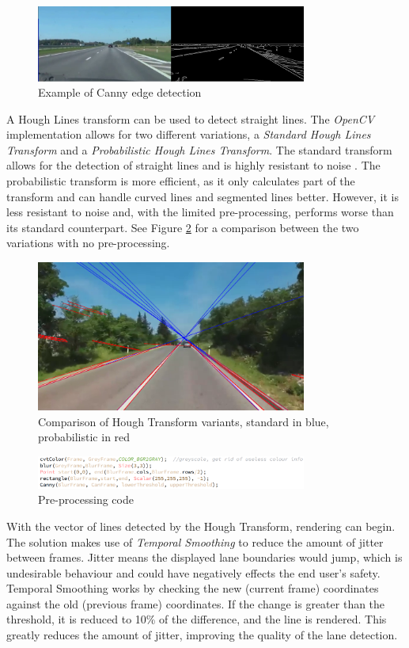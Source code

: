 \documentclass[conference]{IEEEtran}
\begin{document}
\begin{figure}[H]
\centering
\includegraphics[width=3.5in]{t5_edge}
\caption{Example of Canny edge detection}
\label{fig:Canny}
\end{figure}
 

A Hough Lines transform can be used to detect straight lines. The \textit{OpenCV} implementation allows for two different variations, a \textit{Standard Hough Lines Transform} and a \textit{Probabilistic Hough Lines Transform}. The standard transform allows for the detection of straight lines and is highly resistant to noise \cite{4608701}. The probabilistic transform is more efficient, as it only calculates part of the transform and can handle curved lines and segmented lines better. However, it is less resistant to noise and, with the limited pre-processing, performs worse than its standard counterpart. See Figure \ref{fig:houghComp} for a comparison between the two variations with no pre-processing. 
\begin{figure}[H]
\centering
\includegraphics[width=3.5in]{t5_houghcomp}
\caption{Comparison of Hough Transform variants, standard in blue, probabilistic in red}
\label{fig:houghComp}
\end{figure}
\begin{figure}[H]
\centering
\includegraphics[width=3.5in]{t5_proc}
\caption{Pre-processing code}
\label{fig:t5proc}
\end{figure}
With the vector of lines detected by the Hough Transform, rendering can begin. The solution makes use of \textit{Temporal Smoothing}\cite{TemporalSmoothing} to reduce the amount of jitter between frames. Jitter means the displayed lane boundaries would jump, which is undesirable behaviour and could have negatively effects the end user's safety. Temporal Smoothing works by checking the new (current frame) coordinates against the old (previous frame) coordinates. If the change is greater than the threshold, it is reduced to 10\% of the difference, and the line is rendered. This greatly reduces the amount of jitter, improving the quality of the lane detection. 
\end{document}
